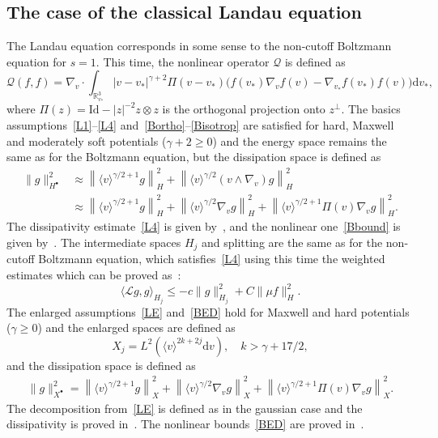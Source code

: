 \documentclass[10pt]{amsart}
\theoremstyle{definition}\newtheorem{defi}[theo]{Definition}\newtheorem{rema}[theo]{Remark}\newtheorem{exam}[theo]{Example}\newtheorem{exem}[theo]{Example}\newtheorem{nota}[theo]{Notation}
\newcommand{\Id}{\mathrm{Id}}
\renewcommand{\d}{\mathrm{d}}
\newcommand{\R}{\mathbb{R}}
\newcommand{\LL}{\mathcal{L}}
\newcommand{\QQ}{\mathcal{Q}}
\newcommand{\Ss}{H}
\newcommand{\Ssp}{H^{\bullet}}
\newcommand{\Sl}{X}
\newcommand{\Slp}{X^{\bullet}}
\renewcommand*\le{\leqslant}
\renewcommand*\ge{\geqslant}
\newcommand{\la}{\langle}
\newcommand{\ra}{\rangle}
\begin{document}
\subsection{The case of the classical Landau equation}

The Landau equation corresponds in some sense to the non-cutoff Boltzmann equation for $s = 1$. This time, the nonlinear operator $\QQ$ is defined as
\begin{equation*}
\QQ(f, f) = \nabla_v \cdot \int_{\R^3_{v_*}} | v - v_* |^{\gamma+2} \Pi(v-v_*) \Big(f(v_*) \nabla_v f(v) - \nabla_{v_*} f(v_*) f(v) \Big) \d v_*,
\end{equation*}
where $\Pi(z) = \Id - |z|^{-2} z \otimes z$ is the orthogonal projection onto $z^\perp$. The basics assumptions~\eqref{L1}--\eqref{L4} and~\eqref{Bortho}--\eqref{Bisotrop} are satisfied for hard, Maxwell and moderately soft potentials ($\gamma + 2 \ge 0$) and the energy space remains the same as for the Boltzmann equation, but the dissipation space is defined as
\begin{align*}
\| g \|^2_{\Ssp} & \approx \left\| \la v \ra^{\gamma/2 + 1} g \right\|_\Ss^2 + \left\| \la v \ra^{\gamma/2} (v \land \nabla_v) g \right\|^2_\Ss \\
& \approx \left\| \la v \ra^{\gamma/2 + 1} g \right\|_\Ss^2 + \left\| \la v \ra^{\gamma/2} \nabla_v g \right\|^2_\Ss + \left\| \la v \ra^{\gamma / 2 + 1} \Pi(v) \nabla_v g \right\|_\Ss^2.
\end{align*}
The dissipativity estimate~\eqref{L4} is given by~\cite[(24)]{G2002}, and the nonlinear one~\eqref{Bbound} is given by~\cite[Lemma~2.2]{R2021}. The intermediate spaces $\Ss_j$ and splitting are the same as for the non-cutoff Boltzmann equation, which satisfies~\eqref{L4} using this time the weighted estimates which can be proved as~\cite[Lemma~6]{G2002}:
\[
\la \LL g, g \ra_{\Ss_j} \le - c \| g \|^2_{\Ss_j} + C \| \mu f \|_{\Ss}^2.
\]
The enlarged assumptions~\eqref{LE} and~\eqref{BED} hold for Maxwell and hard potentials ($\gamma \ge 0$) and the enlarged spaces are defined as
\[
\Sl_j = L^2\left(\la v \ra^{2k + 2 j} \d v \right), \quad k > \gamma + 17/2,
\]
and the dissipation space is defined as
\begin{align*}
\| g \|^2_{\Slp} = \left\| \la v \ra^{\gamma/2 + 1} g \right\|_\Sl^2 + \left\| \la v \ra^{\gamma/2} \nabla_v g \right\|^2_\Sl + \left\| \la v \ra^{\gamma / 2 + 1} \Pi(v) \nabla_v g \right\|_\Sl^2.
\end{align*}
The decomposition from~\eqref{LE} is defined as in the gaussian case and the dissipativity is proved in~\cite[(2.22)-(2.23)]{CTW2016}. The nonlinear bounds~\eqref{BED} are proved in~\cite[Lemma~3.5]{CTW2016}.
\end{document}
